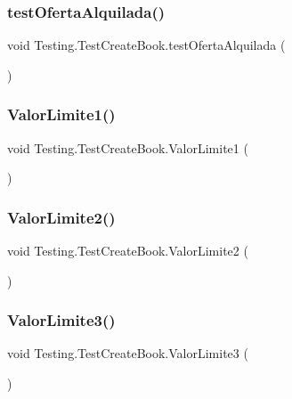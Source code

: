 \subsubsection{\texorpdfstring{testOfertaAlquilada()}{testOfertaAlquilada()}}
{\footnotesize\ttfamily void Testing.\+Test\+Create\+Book.\+test\+Oferta\+Alquilada (\begin{DoxyParamCaption}{ }\end{DoxyParamCaption})}

\mbox{\label{class_testing_1_1_test_create_book_a198ebafb70f3e7233b7a050fdc6660c4}} 
\subsubsection{\texorpdfstring{ValorLimite1()}{ValorLimite1()}}
{\footnotesize\ttfamily void Testing.\+Test\+Create\+Book.\+Valor\+Limite1 (\begin{DoxyParamCaption}{ }\end{DoxyParamCaption})}

\mbox{\label{class_testing_1_1_test_create_book_a996c87c88057d6cc52aff7c69467a77f}} 
\subsubsection{\texorpdfstring{ValorLimite2()}{ValorLimite2()}}
{\footnotesize\ttfamily void Testing.\+Test\+Create\+Book.\+Valor\+Limite2 (\begin{DoxyParamCaption}{ }\end{DoxyParamCaption})}

\mbox{\label{class_testing_1_1_test_create_book_a99968cb22ff2b4012d79a191144f03d1}} 
\subsubsection{\texorpdfstring{ValorLimite3()}{ValorLimite3()}}
{\footnotesize\ttfamily void Testing.\+Test\+Create\+Book.\+Valor\+Limite3 (\begin{DoxyParamCaption}{ }\end{DoxyParamCaption})}

